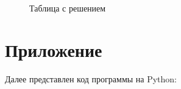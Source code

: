 \documentclass[a4paper,fontsize=14pt]{article}
\begin{document}
	\begin{figure}[h]
		\label{pic2}
		\caption{Таблица с решением}
	\end{figure}

	
	\newpage
	
	\section{Приложение}
	
	Далее представлен код программы на Python: \\
	
	
	
\end{document}
